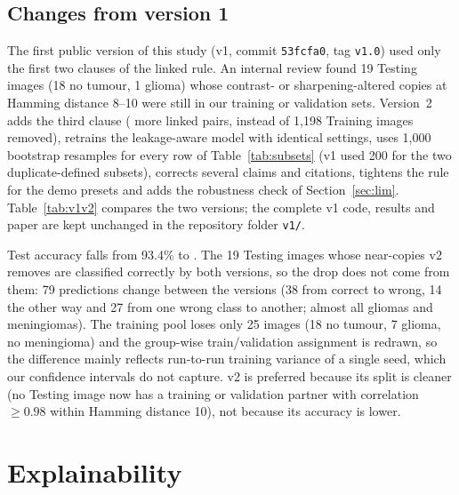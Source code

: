 \documentclass[11pt,a4paper]{article}
\begin{document}
\subsection{Changes from version 1}\label{sec:v1v2}
The first public version of this study (v1, commit \texttt{53fcfa0}, tag \texttt{v1.0}) used only the first two clauses of the linked rule. An internal review found 19 Testing images (18 no tumour, 1 glioma) whose contrast- or sharpening-altered copies at Hamming distance 8--10 were still in our training or validation sets. Version~2 adds the third clause (\DExtraPairsVTwoRule{} more linked pairs, \DTrainImgRemovedCrossSplit{} instead of 1{,}198 Training images removed), retrains the leakage-aware model with identical settings, uses 1{,}000 bootstrap resamples for every row of Table~\ref{tab:subsets} (v1 used 200 for the two duplicate-defined subsets), corrects several claims and citations, tightens the rule for the demo presets and adds the robustness check of Section~\ref{sec:lim}. Table~\ref{tab:v1v2} compares the two versions; the complete v1 code, results and paper are kept unchanged in the repository folder \texttt{v1/}.

Test accuracy falls from 93.4\% to \AccCFull{}. The 19 Testing images whose near-copies v2 removes are classified correctly by both versions, so the drop does not come from them: 79 predictions change between the versions (38 from correct to wrong, 14 the other way and 27 from one wrong class to another; almost all gliomas and meningiomas). The training pool loses only 25 images (18 no tumour, 7 glioma, no meningioma) and the group-wise train/validation assignment is redrawn, so the difference mainly reflects run-to-run training variance of a single seed, which our confidence intervals do not capture. v2 is preferred because its split is cleaner (no Testing image now has a training or validation partner with correlation $\ge 0.98$ within Hamming distance 10), not because its accuracy is lower.

\begin{table}[t]
\centering\small
\caption{Leakage-aware model, v1 (commit \texttt{53fcfa0}) versus v2, on the same 1{,}600 Testing images. All values are read from the saved metric files of each version.}
\label{tab:v1v2}
\resizebox{\linewidth}{!}{}
\end{table}

\section{Explainability}
\end{document}
